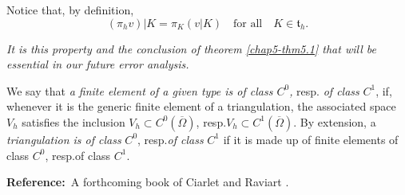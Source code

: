 Notice that, by definition,
\begin{equation*}
(\pi_{h}v)|K=\pi_{K}(v|K)\quad\text{for all}\quad
  K\in\mathfrak{t}_{h}.\tag{5.5}\label{chap5-eq5.5} 
\end{equation*}

{\em It is this property and the conclusion of theorem
  \ref{chap5-thm5.1} that will be essential in our future error
  analysis.}

\begin{definition}\label{chap5-defi5.5}
We say that {\em a finite element of a given type is of class
  $C^{0}$,} resp. {\em of class} $C^{1}$, if, whenever it is the
generic finite element of a triangulation, the associated space
$V_{h}$ satisfies the inclusion $V_{h}\subset
C^{0}(\overline{\Omega})$, resp.\@ $V_{h}\subset
C^{1}(\overline{\Omega})$. By extension, a {\em triangulation is of
  class} $C^{0}$, resp.\@ {\em of class} $C^{1}$ if it is made up of
finite elements of class $C^{0}$, resp.\@ of class $C^{1}$.
\end{definition}

\noindent
{\bf Reference:}~A forthcoming book of Ciarlet and Raviart
\cite{key5}. 
